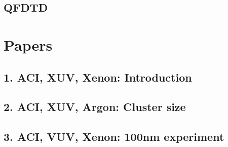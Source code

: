 \documentclass{beamer}
\begin{document}
\subsection{QFDTD}
\begin{frame}{}
\end{frame}


\section{Papers}

\subsection{1. ACI, XUV, Xenon: Introduction}
\begin{frame}{}
\end{frame}

\subsection{2. ACI, XUV, Argon: Cluster size}
\begin{frame}{}
\end{frame}

\subsection{3. ACI, VUV, Xenon: 100nm experiment}
\begin{frame}{}
\end{frame}
\end{document}
